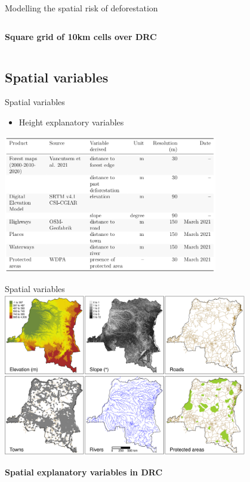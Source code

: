 \documentclass[10pt,table,dvipsnames,compress]{beamer}
\begin{document}
\begin{frame}[label={sec:orgda4c3f3}]{Modelling the spatial risk of deforestation}
\begin{columns}
\begin{column}{0.5\columnwidth}
\textbf{Square grid of 10km cells over DRC}
\end{column}
\end{columns}
\end{frame}

\subsection{Spatial variables}
\label{sec:orgb082088}
\begin{frame}[label={sec:orgfaea2ed}]{Spatial variables}
\begin{itemize}
\item Height explanatory variables
\end{itemize}

\centering \includegraphics[width=0.7\textwidth]{figs/variables-tab}
\end{frame}

\begin{frame}[label={sec:org8f95bb8}]{Spatial variables}
\centering \includegraphics[width=0.8\textwidth]{figs/sm/var.png}

\textbf{Spatial explanatory variables in DRC}
\end{frame}
\end{document}
